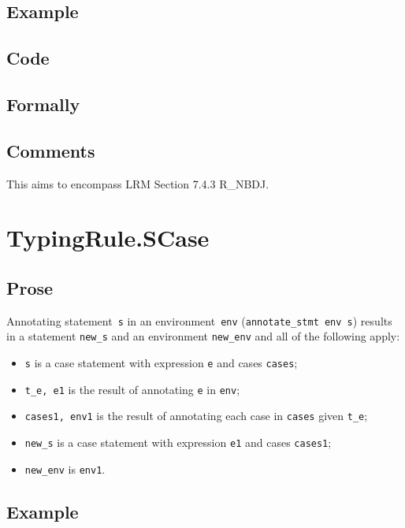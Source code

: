 \documentclass{book}
\begin{document}
  \subsection{Example}

  \subsection{Code}

\begin{emptyformal}
    \subsection{Formally}
\end{emptyformal}

\subsection{Comments}
    This aims to encompass LRM Section 7.4.3 R\_NBDJ.

\section{TypingRule.SCase \label{sec:TypingRule.SCase}}

  \subsection{Prose}
Annotating statement~\texttt{s} in an environment~\texttt{env}
(\texttt{annotate\_stmt env s}) results in a statement \texttt{new\_s} and an
environment \texttt{new\_env} and all of the following apply:
   \begin{itemize}
   \item \texttt{s} is a case statement with expression \texttt{e} and cases \texttt{cases};
   \item \texttt{t\_e, e1} is the result of annotating \texttt{e} in \texttt{env};
   \item \texttt{cases1, env1} is the result of annotating each case in \texttt{cases} given \texttt{t\_e};
   \item \texttt{new\_s} is a case statement with expression \texttt{e1} and cases \texttt{cases1};
   \item \texttt{new\_env} is \texttt{env1}.
   \end{itemize}

  \subsection{Example}
\end{document}
